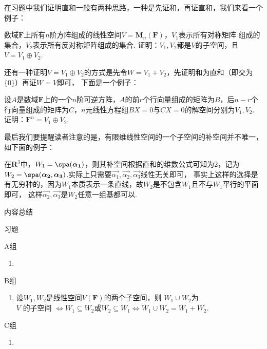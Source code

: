 在习题中我们证明直和一般有两种思路，一种是先证和，再证直和，我们来看一个例子：
\begin{example}
    数域$\mathbf{F}$上所有$n$阶方阵组成的线性空间$V=\mathbf{M}_n(\mathbf{F})$，$V_1$表示所有对称矩阵
    组成的集合，$V_2$表示所有反对称矩阵组成的集合. 证明：$V_1,V_2$都是$V$的子空间，且$V=V_1\oplus V_2$.
\end{example}
还有一种证明$V=V_1\oplus V_2$的方式是先令$W=V_1+V_2$，先证明和为直和（即交为$\{0\}$）再证$W=V$即可，
下面是一个例子：
\begin{example}
    设$A$是数域$\mathbf{F}$上的一个$n$阶可逆方阵，$A$的前$r$个行向量组成的矩阵为$B$，后$n-r$个
    行向量组成的矩阵为$C$，$n$元线性方程组$BX=0$与$CX=0$的解空间分别为$V_1,V_2$. 证明：$\mathbf{F}^n=V_1\oplus V_2$.
\end{example}

最后我们要提醒读者注意的是，有限维线性空间的一个子空间的补空间并不唯一，如下面的例子：
\begin{example}
    在$\mathbf{R}^3$中，$W_1=\spa(\vec{\alpha_1})$，则其补空间根据直和的维数公式可知为2，记为
    $W_2=\spa(\vec{\alpha_2},\vec{\alpha_3})$.实际上只需要$\vec{\alpha_1},\vec{\alpha_2},\vec{\alpha_3}$线性无关即可，
    事实上这样的选择是有无穷种的，因为$W_1$本质表示一条直线，故$W_2$是不包含$W_1$且不与$W_1$平行的平面即可，
    这样$\vec{\alpha_2},\vec{\alpha_3}$是$W_2$任意一组基都可以.
\end{example}

\vspace{2ex}
\centerline{\heiti \Large 内容总结}

\vspace{2ex}

\centerline{\heiti \Large 习题}
\vspace{2ex}
{\kaishu }
\begin{flushright}
    \kaishu

\end{flushright}
\centerline{\heiti A组}
\begin{enumerate}
    \item
\end{enumerate}
\centerline{\heiti B组}
\begin{enumerate}
    \item 设$W_1,W_2$是线性空间$V(\mathbf{F})$的两个子空间，则
    $W_1 \cup W_2$为$V\text{ 的子空间 } \iff W_1 \subseteq W_2$或$W_2 \subseteq W_1 \iff W_1 \cup W_2=W_1+W_2$.

\end{enumerate}
\centerline{\heiti C组}
\begin{enumerate}
    \item
\end{enumerate}
